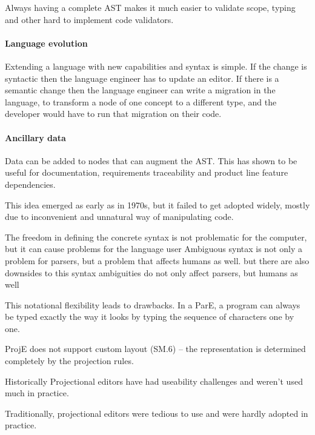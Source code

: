 Always having a complete AST makes it much easier to validate scope, typing and other hard to implement code validators.

\paragraph{Language evolution}
Extending a language with new capabilities and syntax is simple.
If the change is syntactic then the language engineer has to update an editor.
If there is a semantic change then the language engineer can write a migration in the language, to transform a node of one concept to a different type, and the developer would have to run that migration on their code.

\paragraph{Ancillary data}
Data can be added to nodes that can augment the AST. 
This has shown to be useful for documentation, requirements traceability and product line feature dependencies.












This idea emerged as early as in 1970s, but it failed to get adopted widely, mostly due to inconvenient and unnatural way of manipulating code.

The freedom in defining the concrete syntax is not problematic for the computer, but it can cause problems for the language user 
Ambiguous syntax is not only a problem for parsers, but a problem that affects humans as well. 
but there are also downsides to this syntax ambiguities do not only affect parsers, but humans as well 

This notational flexibility leads to drawbacks.
In a ParE, a program can always be typed exactly the way it looks by typing the sequence of characters one by one.

ProjE does not support custom layout (SM.6) – the representation is determined completely by the projection rules.

Historically Projectional editors have had useability challenges and weren't used much in practice.  

Traditionally, projectional editors were tedious to use and were hardly adopted in practice.



